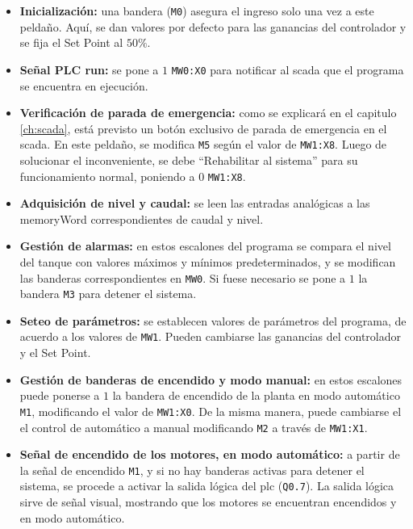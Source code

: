 \begin{itemize}
 \item \textbf{Inicialización:} una bandera (\verb|M0|) asegura el ingreso solo
una vez a este peldaño. Aquí, se dan valores por defecto para las
ganancias del controlador y se fija el Set Point al $50\%$.

 \item \textbf{Señal PLC run:} se pone a $1$ \verb|MW0:X0| para notificar al
 \gls{scada} que el programa se encuentra en ejecución.

 \item \textbf{Verificación de parada de emergencia:}
  como se explicará en el capitulo \ref{ch:scada}, está previsto un
 botón exclusivo de parada de emergencia en el \gls{scada}.
 En este peldaño, se modifica \verb|M5| según el valor de \verb|MW1:X8|.
 Luego de solucionar el inconveniente,
 se debe ``Rehabilitar al sistema'' para su funcionamiento normal, poniendo a
 $0$ \verb|MW1:X8|.

 \item \textbf{Adquisición de nivel y caudal:} se leen las entradas analógicas
 a las \gls{memoryWord} correspondientes de caudal y nivel.

 \item \textbf{Gestión de alarmas:} en estos escalones del programa se compara
el nivel del tanque con valores máximos y mínimos predeterminados, y se
modifican las banderas correspondientes en \verb|MW0|. Si fuese necesario se
pone a $1$ la bandera \verb|M3| para detener el sistema.

  \item \textbf{Seteo de parámetros:}
  se establecen valores de parámetros del programa, de acuerdo
a los valores de \verb|MW1|.
Pueden cambiarse las ganancias del controlador y el Set Point.

  \item \textbf{Gestión de banderas de encendido y modo manual:} en estos
  escalones puede ponerse a $1$ la
  bandera de encendido de la planta en modo automático \verb|M1|, modificando
el valor de \verb|MW1:X0|.
  De la misma manera, puede cambiarse el
  el control de automático a manual modificando \verb|M2| a través de
  \verb|MW1:X1|.

  \item \textbf{Señal de encendido de los motores, en modo automático:} a
  partir de la señal de encendido \verb|M1|, y si no hay banderas activas para 
detener el sistema, se
  procede a activar la salida lógica del  \gls{plc} (\verb|Q0.7|).
  La salida lógica sirve de señal visual, mostrando que los motores se
encuentran encendidos y en modo automático.


\end{itemize}
